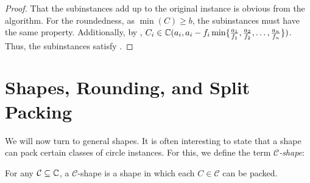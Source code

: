 \documentclass[%
    a4paper,              %
    style=screen,          %
    bibliography=totoc,   %
    nexus,                %
    lnum,                 %
    extramargin,          %
]{tubsbook}
\begin{document}
\begin{proof}
    That the subinstances add up to the original instance is obvious from the algorithm.
    For the roundedness, as $\min(C) \ge b$, the subinstances must have the same property. Additionally, by , $C_i \in \mathbb{C}(a_i, a_i - f_i \min\{\frac{a_1}{f_1}, \frac{a_2}{f_2}, \dots, \frac{a_n}{f_n}\})$. Thus, the subinstances satisfy .
\end{proof}



\section{Shapes, Rounding, and Split Packing}

We will now turn to general shapes. It is often interesting to state that a shape can pack certain classes of circle instances. For this, we define the term \emph{$\mathcal{C}$-shape}:

\begin{definition}
    For any $\mathcal{C} \subseteq \mathbb{C}$, a $\mathcal{C}$-shape is a shape in which each $C \in \mathcal{C}$ can be packed.
\end{definition}
\end{document}
